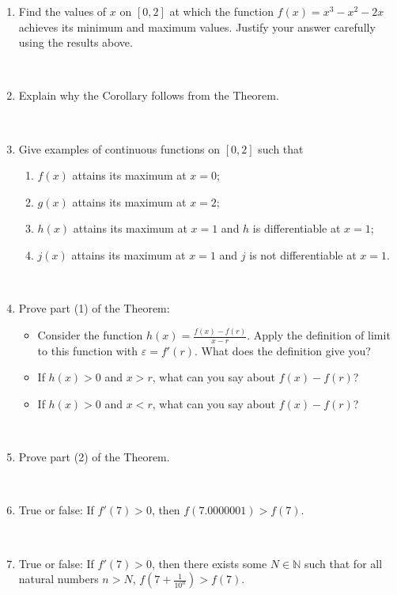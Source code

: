 \documentclass[12pt]{amsart}
\newcommand{\N}{\mathbb{N}}
\newcommand{\e}{\varepsilon}
\newcommand{\ds}{\displaystyle}
\begin{document}
 \begin{enumerate}
 
 \item Find the values of $x$ on $[0,2]$ at which the function $f(x) = x^3-x^2-2x$ achieves its minimum and maximum values. Justify your answer carefully using the results above.
 
 \ 
 
 \item Explain why the Corollary follows from the Theorem.
 
 \
 
 \item Give examples of continuous functions on $[0,2]$ such that
 \begin{enumerate}
 \item $f(x)$ attains its maximum at $x=0$;
 \item $g(x)$ attains its maximum at $x=2$;
 \item $h(x)$ attains its maximum at $x=1$ and $h$ is differentiable at $x=1$;
 \item $j(x)$ attains its maximum at $x=1$ and $j$ is not differentiable at $x=1$.
 \end{enumerate}
 
 \
 
 \item Prove part (1) of the Theorem:
 \begin{itemize}
 \item Consider the function $\ds h(x) = \frac{ f(x) - f(r) }{x-r}$. Apply the definition of limit to this function with $\e = f'(r)$. What does the definition give you?
 \item If $h(x) > 0$ and $x>r$, what can you say about $f(x) - f(r)$?
  \item If $h(x) > 0$ and $x<r$, what can you say about $f(x) - f(r)$?
  \end{itemize}


\

 \item Prove part (2) of the Theorem.
 
 \
 
 \item True or false: If $f'(7)>0$, then $f(7.0000001)>f(7)$.
 
 \
 
  \item True or false: If $f'(7)>0$, then there exists some $N\in \N$ such that for all natural numbers $n>N$,  $f\left(7+ \frac{1}{10^n}\right)>f(7)$.

 
\end{enumerate}
\end{document}
